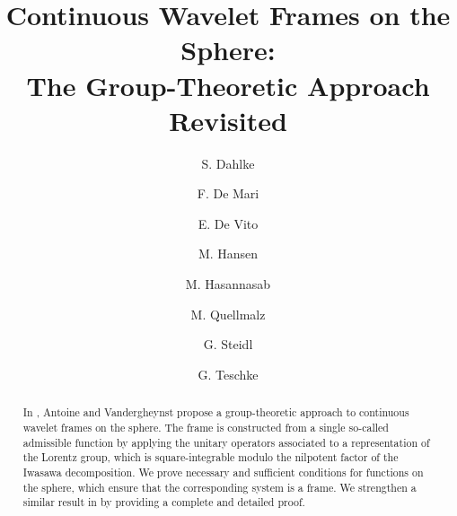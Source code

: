 \documentclass[a4paper,11pt,DIV=11,%
abstract=on%
]{scrartcl}
\newcommand{\red}[1]{#1}
\begin{document}
\title{Continuous Wavelet Frames on the Sphere:\\
The Group-Theoretic Approach Revisited
}
\author{S. Dahlke\footnotemark[1]
\and
F. De Mari \footnotemark[2]
	\and
	E. De Vito\footnotemark[2]
	\and
	M. Hansen\footnotemark[1]	
	\and
	M. Hasannasab\footnotemark[3]	
	\and
	M. Quellmalz
	\footnotemark[3]
	\and 
	G. Steidl\footnotemark[3]
	\and 
	G. Teschke
	\footnotemark[4]
}

\maketitle

	


\begin{abstract}
\red{ In \cite{AV99}, Antoine and  Vandergheynst propose a
group-theoretic approach to continuous wavelet frames on the
sphere.   The frame is constructed from a single so-called admissible function 
by applying the unitary operators associated to a representation of the
Lorentz group, which is square-integrable modulo the nilpotent factor
of the Iwasawa decomposition. 
We prove necessary and sufficient conditions for functions on the
sphere, which ensure that the corresponding system is a frame.   We strengthen a similar result in \cite{AV99} by
providing a complete and detailed proof. }
\end{abstract}

\end{document}
